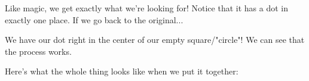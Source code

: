         Like magic, we get exactly what we're looking for! Notice that it has a dot in exactly one place. If we go back to the original...
        
        
        We have our dot right in the center of our empty square/"circle"! We can see that the process works.
        
        Here's what the whole thing looks like when we put it together:
        
